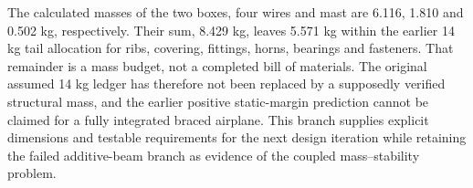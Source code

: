 The calculated masses of the two boxes, four wires and mast are 6.116,
1.810 and 0.502 kg, respectively. Their sum, 8.429 kg, leaves 5.571 kg within
the earlier 14 kg tail allocation for ribs, covering, fittings, horns,
bearings and fasteners. That remainder is a mass budget, not a completed bill
of materials. The original assumed 14 kg ledger has therefore not been
replaced by a supposedly verified structural mass, and the earlier positive
static-margin prediction cannot be claimed for a fully integrated braced
airplane. This branch supplies explicit dimensions and testable requirements
for the next design iteration while retaining the failed additive-beam branch
as evidence of the coupled mass--stability problem.

